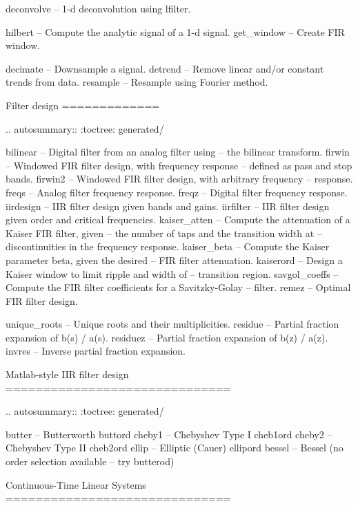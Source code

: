 \begin{DoxyVerb}
   deconvolve    -- 1-d deconvolution using lfilter.

   hilbert       -- Compute the analytic signal of a 1-d signal.
   get_window    -- Create FIR window.

   decimate      -- Downsample a signal.
   detrend       -- Remove linear and/or constant trends from data.
   resample      -- Resample using Fourier method.

Filter design
=============

.. autosummary::
   :toctree: generated/

   bilinear      -- Digital filter from an analog filter using
                -- the bilinear transform.
   firwin        -- Windowed FIR filter design, with frequency response
                -- defined as pass and stop bands.
   firwin2       -- Windowed FIR filter design, with arbitrary frequency
                -- response.
   freqs         -- Analog filter frequency response.
   freqz         -- Digital filter frequency response.
   iirdesign     -- IIR filter design given bands and gains.
   iirfilter     -- IIR filter design given order and critical frequencies.
   kaiser_atten  -- Compute the attenuation of a Kaiser FIR filter, given
                -- the number of taps and the transition width at
                -- discontinuities in the frequency response.
   kaiser_beta   -- Compute the Kaiser parameter beta, given the desired
                -- FIR filter attenuation.
   kaiserord     -- Design a Kaiser window to limit ripple and width of
                -- transition region.
   savgol_coeffs -- Compute the FIR filter coefficients for a Savitzky-Golay
                -- filter.
   remez         -- Optimal FIR filter design.

   unique_roots  -- Unique roots and their multiplicities.
   residue       -- Partial fraction expansion of b(s) / a(s).
   residuez      -- Partial fraction expansion of b(z) / a(z).
   invres        -- Inverse partial fraction expansion.

Matlab-style IIR filter design
==============================

.. autosummary::
   :toctree: generated/

   butter -- Butterworth
   buttord
   cheby1 -- Chebyshev Type I
   cheb1ord
   cheby2 -- Chebyshev Type II
   cheb2ord
   ellip -- Elliptic (Cauer)
   ellipord
   bessel -- Bessel (no order selection available -- try butterod)

Continuous-Time Linear Systems
==============================


\end{DoxyVerb}
